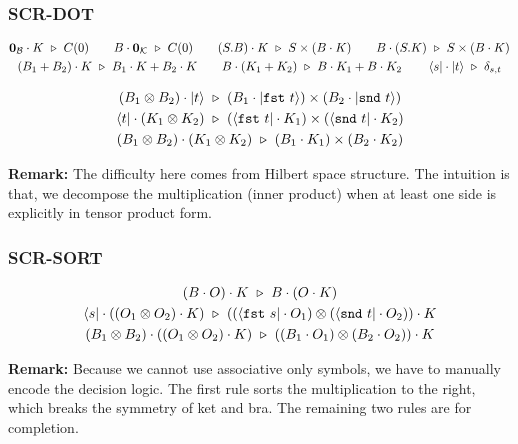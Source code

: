 \documentclass[manuscript, review, timestamp]{acmart}
\newcommand*{\fst}{\texttt{fst}}
\newcommand*{\snd}{\texttt{snd}}
\newcommand*{\reduce}{\ \triangleright\ }
\begin{document}
\subsubsection*{\textsf{SCR-DOT}}
\begin{gather*}
  \mathbf{0}_\mathcal{B} \cdot K \reduce C(0)
  \qquad
  B \cdot \mathbf{0}_\mathcal{K} \reduce C(0)
  \qquad
  (S.B) \cdot K \reduce S \times (B \cdot K)
  \qquad
  B \cdot (S.K) \reduce S \times (B \cdot K) \\
  (B_1 + B_2) \cdot K \reduce B_1 \cdot K + B_2 \cdot K
  \qquad
  B \cdot (K_1 + K_2) \reduce B \cdot K_1 + B \cdot K_2
  \qquad
  \bra{s} \cdot \ket{t} \reduce \delta_{s, t} \\
\end{gather*}

\begin{gather*}
  (B_1 \otimes B_2) \cdot \ket{t} \reduce (B_1 \cdot \ket{\fst\ t}) \times (B_2 \cdot \ket{\snd\ t}) \\
  \bra{t} \cdot (K_1 \otimes K_2) \reduce (\bra{\fst\ t} \cdot K_1) \times (\bra{\snd\ t} \cdot K_2) \\
  (B_1 \otimes B_2) \cdot (K_1 \otimes K_2) \reduce (B_1 \cdot K_1) \times (B_2 \cdot K_2)
\end{gather*}

\textbf{Remark:} The difficulty here comes from Hilbert space structure. The intuition is that, we decompose the multiplication (inner product) when at least one side is explicitly in tensor product form.

\subsubsection*{\textsf{SCR-SORT}}
\begin{gather*}
  (B \cdot O) \cdot K \reduce B \cdot (O \cdot K) \\
  \bra{s} \cdot ((O_1 \otimes O_2) \cdot K) \reduce ((\bra{\fst\ s} \cdot O_1) \otimes (\bra{\snd\ t} \cdot O_2)) \cdot K \\
  (B_1 \otimes B_2) \cdot ((O_1 \otimes O_2) \cdot K) \reduce ((B_1 \cdot O_1) \otimes (B_2 \cdot O_2)) \cdot K \\
\end{gather*}


\textbf{Remark:} Because we cannot use associative only symbols, we have to manually encode the decision logic. The first rule sorts the multiplication to the right, which breaks the symmetry of ket and bra. The remaining two rules are for completion.
\end{document}
